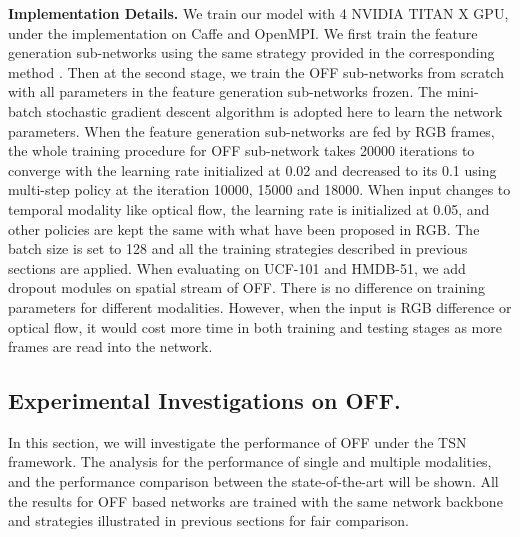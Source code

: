 \documentclass[10pt,twocolumn,letterpaper]{article}
\begin{document}
\textbf{Implementation Details.} We train our model with 4 NVIDIA TITAN X GPU, under the implementation on Caffe \cite{jia2014caffe} and OpenMPI. We first train the feature generation sub-networks using the same strategy provided in the corresponding method \cite{wang2016tsn}. 
Then at the second stage, we train the OFF sub-networks from scratch with all parameters in the feature generation sub-networks frozen. The mini-batch stochastic gradient descent algorithm is adopted here to learn the network parameters. When the feature generation sub-networks are fed by RGB frames, the whole training procedure for OFF sub-network takes 20000 iterations to converge with the learning rate initialized at 0.02 and decreased to its 0.1 using multi-step policy at the iteration 10000, 15000 and 18000. When input changes to temporal modality like optical flow, the learning rate is initialized at 0.05, and other policies are kept the same with what have been proposed in RGB. The batch size is set to 128 and all the training strategies described in previous sections are applied. When evaluating on UCF-101 and HMDB-51, we add dropout modules on spatial stream of OFF.
There is no difference on training parameters for different modalities. However, when the input is RGB difference or optical flow, it would cost more time in both training and testing stages as more frames are read into the network.

\subsection{Experimental Investigations on OFF.}

In this section, we will investigate the performance of OFF under the TSN framework. The analysis for the performance of single and multiple modalities, and the performance comparison between the state-of-the-art will be shown. All the results for OFF based networks are trained with the same network backbone and strategies illustrated in previous sections for fair comparison.
\end{document}
